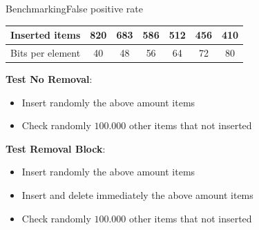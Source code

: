 \documentclass[
  english,            %
  aspectratio=169,    %
]{tumbeamer}
\begin{document}
\begin{frame}{Benchmarking}{False positive rate}

    \begin{table}[h]
        \begin{tabular}{|c|c|c|c|c|c|c|}
            \hline
            Inserted items & 820 & 683 & 586 & 512 & 456 & 410 \\
            \hline
            Bits per element & 40 & 48 & 56 & 64 & 72 & 80 \\
            \hline
        \end{tabular}
        \label{tab:items}
    \end{table}
    
    \textbf{Test No Removal}:
    \begin{itemize}
        \item Insert randomly the above amount items
        \item Check randomly $100.000$ other items that not inserted
    \end{itemize}
    \vspace{5pt}
    \textbf{Test Removal Block}:
    \begin{itemize}
        \item Insert randomly the above amount items
        \item Insert and delete immediately the above amount items
        \item Check randomly $100.000$ other items that not inserted
    \end{itemize}
\end{frame}
\end{document}

